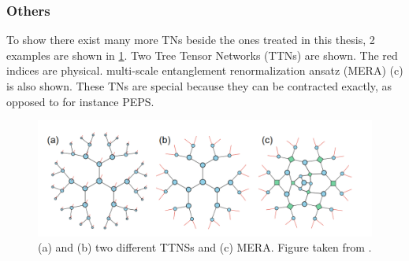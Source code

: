 \subsubsection{Others}

To show there exist many more \Glspl{TN} beside the ones treated in this thesis, 2 examples are shown in \cref{fig:tnalgs:ttn_mera}. Two Tree Tensor Networks (TTNs)  are shown. The red indices are physical. multi-scale entanglement renormalization ansatz (MERA) (c) is also shown. These \Glspl{TN} are special because they can be contracted exactly, as opposed to for instance \Gls{PEPS}.

\begin{figure}[h!]
    \center
    \includegraphics[width=0.8 \textwidth]{Figuren/tnalgs/tnns_and_mera.png}
    \caption{ (a) and (b) two different TTNSs and (c) MERA. Figure taken from \cite{Ran2020}.  }
    \label{fig:tnalgs:ttn_mera}
\end{figure}

